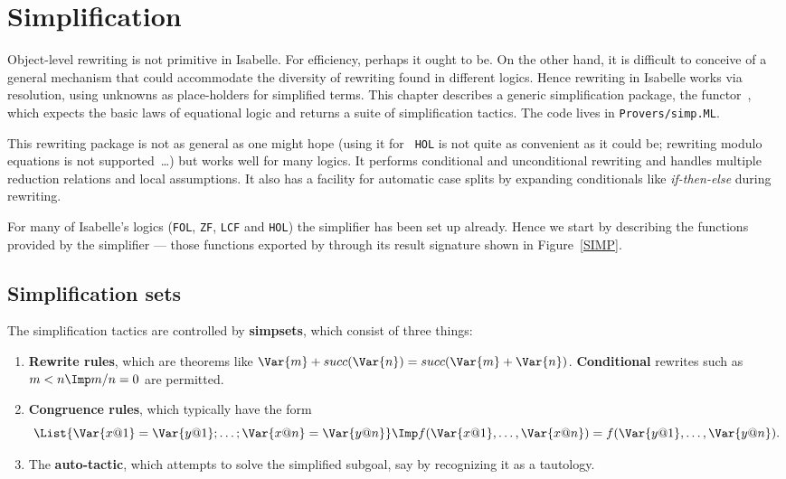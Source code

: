 \chapter{Simplification} \label{simp-chap}
Object-level rewriting is not primitive in Isabelle.  For efficiency,
perhaps it ought to be.  On the other hand, it is difficult to conceive of
a general mechanism that could accommodate the diversity of rewriting found
in different logics.  Hence rewriting in Isabelle works via resolution,
using unknowns as place-holders for simplified terms.  This chapter
describes a generic simplification package, the functor~,
which expects the basic laws of equational logic and returns a suite of
simplification tactics.  The code lives in
\verb$Provers/simp.ML$.

This rewriting package is not as general as one might hope (using it for {\tt
HOL} is not quite as convenient as it could be; rewriting modulo equations is
not supported~\ldots) but works well for many logics.  It performs
conditional and unconditional rewriting and handles multiple reduction
relations and local assumptions.  It also has a facility for automatic case
splits by expanding conditionals like {\it if-then-else\/} during rewriting.

For many of Isabelle's logics ({\tt FOL}, {\tt ZF}, {\tt LCF} and {\tt HOL})
the simplifier has been set up already. Hence we start by describing the
functions provided by the simplifier --- those functions exported by
 through its result signature  shown in
Figure~\ref{SIMP}.  


\section{Simplification sets}
The simplification tactics are controlled by {\bf simpsets}, which consist of
three things:
\begin{enumerate}
\item {\bf Rewrite rules}, which are theorems like 
$\Var{m} + succ(\Var{n}) = succ(\Var{m} + \Var{n})$.  {\bf Conditional}
rewrites such as $m<n \Imp m/n = 0$ are permitted.

\item {\bf Congruence rules}, which typically have the form
\[ \List{\Var{x@1} = \Var{y@1}; \ldots; \Var{x@n} = \Var{y@n}} \Imp
   f(\Var{x@1},\ldots,\Var{x@n}) = f(\Var{y@1},\ldots,\Var{y@n}).
\]

\item The {\bf auto-tactic}, which attempts to solve the simplified
subgoal, say by recognizing it as a tautology.
\end{enumerate}

